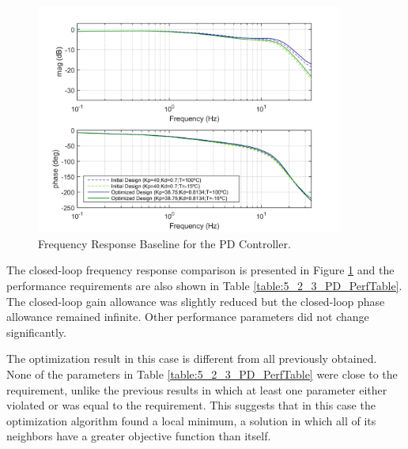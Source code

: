 \begin{figure}[H]
	\centering
	\centerline{\includegraphics[width=0.9\textwidth]{Figuras/5.OptimizationResults/5-2-3-PD-FrequencyResponseComparison.jpg}}
	\caption{Frequency Response Baseline for the PD Controller.}
	\label{fig:5_2_3_PD_FreqResp}
\end{figure}

The closed-loop frequency response comparison is presented in Figure \ref{fig:5_2_3_PD_FreqResp} and the performance requirements are also shown in Table \ref{table:5_2_3_PD_PerfTable}. The closed-loop gain allowance was slightly reduced but the closed-loop phase allowance remained infinite. Other performance parameters did not change significantly.

The optimization result in this case is different from all previously obtained. None of the parameters in Table \ref{table:5_2_3_PD_PerfTable} were close to the requirement, unlike the previous results in which at least one parameter either violated or was equal to the requirement. This suggests that in this case the optimization algorithm found a local minimum, a solution in which all of its neighbors have a greater objective function than itself.

